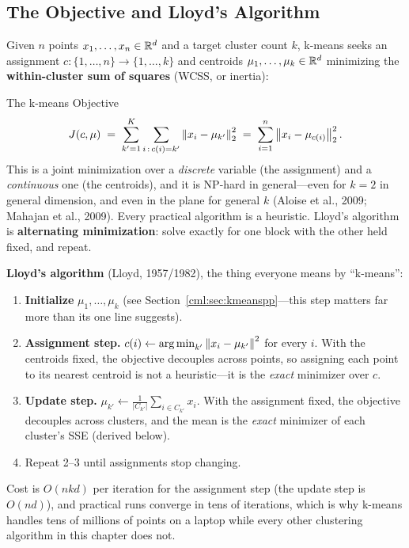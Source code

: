 \subsection{The Objective and Lloyd's Algorithm}

Given $n$ points $x_1, \ldots, x_n \in \mathbb{R}^d$ and a target cluster count $k$, k-means seeks an assignment $c: \{1,\ldots,n\} \to \{1,\ldots,k\}$ and centroids $\mu_1, \ldots, \mu_k \in \mathbb{R}^d$ minimizing the \textbf{within-cluster sum of squares} (WCSS, or inertia):

\begin{mathresult}{The k-means Objective}
\begin{equation}
J(c, \mu) \;=\; \sum_{k'=1}^{K} \sum_{i \,:\, c(i) = k'} \left\lVert x_i - \mu_{k'}\right\rVert_2^2
\;=\; \sum_{i=1}^{n} \left\lVert x_i - \mu_{c(i)}\right\rVert_2^2 .
\end{equation}
This is a joint minimization over a \emph{discrete} variable (the assignment) and a \emph{continuous} one (the centroids), and it is NP-hard in general---even for $k=2$ in general dimension, and even in the plane for general $k$ (Aloise et al., 2009; Mahajan et al., 2009). Every practical algorithm is a heuristic. Lloyd's algorithm is \textbf{alternating minimization}: solve exactly for one block with the other held fixed, and repeat.
\end{mathresult}

\textbf{Lloyd's algorithm} (Lloyd, 1957/1982), the thing everyone means by ``k-means'':
\begin{enumerate}
    \item \textbf{Initialize} $\mu_1, \ldots, \mu_k$ (see Section~\ref{cml:sec:kmeanspp}---this step matters far more than its one line suggests).
    \item \textbf{Assignment step.} $c(i) \leftarrow \operatorname*{arg\,min}_{k'} \left\lVert x_i - \mu_{k'}\right\rVert^2$ for every $i$. With the centroids fixed, the objective decouples across points, so assigning each point to its nearest centroid is not a heuristic---it is the \emph{exact} minimizer over $c$.
    \item \textbf{Update step.} $\mu_{k'} \leftarrow \frac{1}{|C_{k'}|}\sum_{i \in C_{k'}} x_i$. With the assignment fixed, the objective decouples across clusters, and the mean is the \emph{exact} minimizer of each cluster's SSE (derived below).
    \item Repeat 2--3 until assignments stop changing.
\end{enumerate}

Cost is $O(nkd)$ per iteration for the assignment step (the update step is $O(nd)$), and practical runs converge in tens of iterations, which is why k-means handles tens of millions of points on a laptop while every other clustering algorithm in this chapter does not.


